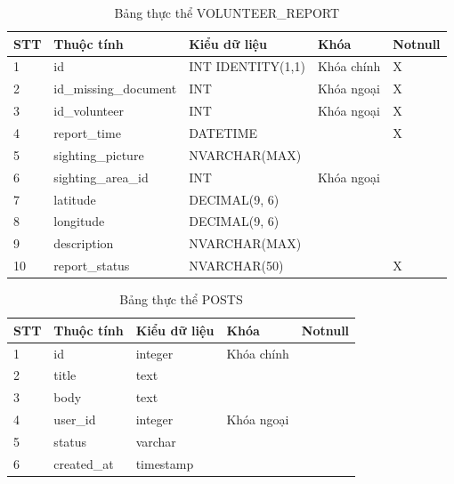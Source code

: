 \documentclass[../DoAn.tex]{subfiles}
\begin{document}
\begin{table}[H]
	\centering{}
	\begin{tabular}{m{1cm} m{4cm} m{3.5cm} m{3cm} m{1.5cm}}
		\hline
		\textbf{STT} & \textbf{Thuộc tính}   & \textbf{Kiểu dữ liệu} & \textbf{Khóa} & \textbf{Notnull}
		\\ \hline
		1            & id                    & INT IDENTITY(1,1)     & Khóa chính    & X
		\\ \hline
		2            & id\_missing\_document & INT                   & Khóa ngoại    & X
		\\ \hline
		3            & id\_volunteer         & INT                   & Khóa ngoại    & X
		\\ \hline
		4            & report\_time          & DATETIME              &               & X
		\\ \hline
		5            & sighting\_picture     & NVARCHAR(MAX)         &               &
		\\ \hline
		6            & sighting\_area\_id    & INT                   & Khóa ngoại    &
		\\ \hline
		7            & latitude              & DECIMAL(9, 6)         &               &
		\\ \hline
		8            & longitude             & DECIMAL(9, 6)         &               &
		\\ \hline
		9            & description           & NVARCHAR(MAX)         &               &
		\\ \hline
		10           & report\_status        & NVARCHAR(50)          &               & X
		\\ \hline
	\end{tabular}
	\caption{Bảng thực thể VOLUNTEER\_REPORT}
\end{table}

\begin{table}[H]
	\centering{}
	\begin{tabular}{m{1cm} m{4cm} m{3.5cm} m{3cm} m{1.5cm}}
		\hline
		\textbf{STT} & \textbf{Thuộc tính} & \textbf{Kiểu dữ liệu} & \textbf{Khóa} & \textbf{Notnull}
		\\ \hline
		1            & id                  & integer               & Khóa chính    &
		\\ \hline
		2            & title               & text                  &               &
		\\ \hline
		3            & body                & text                  &               &
		\\ \hline
		4            & user\_id            & integer               & Khóa ngoại    &
		\\ \hline
		5            & status              & varchar               &               &
		\\ \hline
		6            & created\_at         & timestamp             &               &
		\\ \hline
	\end{tabular}
	\caption{Bảng thực thể POSTS}
\end{table}
\end{document}

